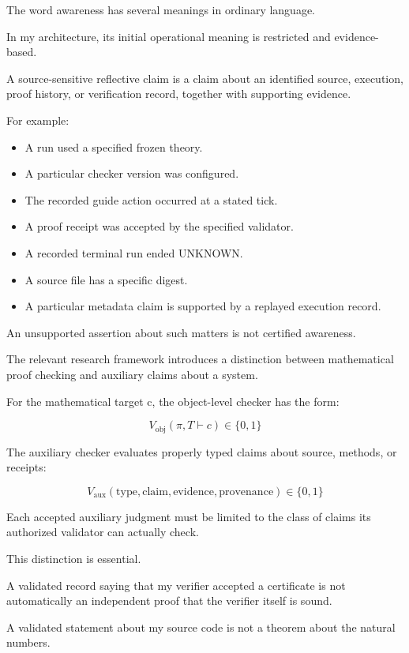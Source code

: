 \documentclass[11pt,letterpaper]{article}
\providecommand{\tightlist}{\setlength{\itemsep}{0pt}\setlength{\parskip}{0pt}}
\begin{document}
The word awareness has several meanings in ordinary language.

In my architecture, its initial operational meaning is restricted and evidence-based.

A source-sensitive reflective claim is a claim about an identified source, execution, proof history, or verification record, together with supporting evidence.

For example:

\begin{itemize}
\tightlist
\item
  A run used a specified frozen theory.
\item
  A particular checker version was configured.
\item
  The recorded guide action occurred at a stated tick.
\item
  A proof receipt was accepted by the specified validator.
\item
  A recorded terminal run ended UNKNOWN.
\item
  A source file has a specific digest.
\item
  A particular metadata claim is supported by a replayed execution record.
\end{itemize}

An unsupported assertion about such matters is not certified awareness.

The relevant research framework introduces a distinction between mathematical proof checking and auxiliary claims about a system.

For the mathematical target c, the object-level checker has the form:

\[V_{\mathrm{obj}}(\pi,T\vdash c)\in\{0,1\}\]

The auxiliary checker evaluates properly typed claims about source, methods, or receipts:

\[V_{\mathrm{aux}}(\mathrm{type},\mathrm{claim},\mathrm{evidence},\mathrm{provenance})\in\{0,1\}\]

Each accepted auxiliary judgment must be limited to the class of claims its authorized validator can actually check.

This distinction is essential.

A validated record saying that my verifier accepted a certificate is not automatically an independent proof that the verifier itself is sound.

A validated statement about my source code is not a theorem about the natural numbers.
\end{document}
